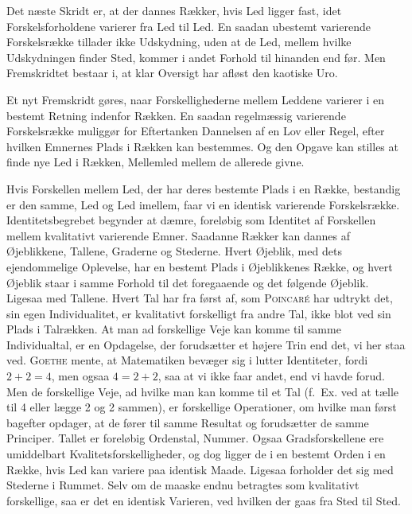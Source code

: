 \documentclass[12pt]{article}
\newcommand{\opage}[1]{\marginnote{\footnotesize\textit{[#1]}}}
\begin{document}
Det næste Skridt er, at der dannes Rækker, hvis Led ligger fast, idet
Forskelsforholdene varierer fra Led til Led. En saadan ubestemt varierende
Forskelsrække tillader ikke Udskydning, uden at de Led, mellem hvilke
Udskydningen finder Sted, kommer i andet Forhold til hinanden end før. Men
Fremskridtet bestaar i, at klar Oversigt har afløst den kaotiske Uro.

Et nyt Fremskridt gøres, naar Forskellighederne mellem Leddene varierer i en
bestemt Retning indenfor Rækken. En saadan regelmæssig varierende
Forskelsrække muliggør for Eftertanken Dannelsen af en Lov eller Regel, efter
hvilken Emnernes Plads i Rækken kan bestemmes.
Og den Opgave kan stilles at finde nye Led i Rækken, Mellemled mellem de
allerede givne.

Hvis Forskellen mellem Led, der har deres bestemte Plads i en Række, bestandig
er den samme, Led og Led imellem, faar vi en identisk varierende Forskelsrække.
Identitetsbegrebet begynder at dæmre, foreløbig som Identitet af Forskellen
mellem kvalitativt varierende Emner. Saadanne Rækker kan dannes af
Øjeblikkene, Tallene, Graderne og Stederne. Hvert Øjeblik, med dets
ejendommelige Oplevelse, har en bestemt Plads i Øjeblikkenes Række, og hvert
Øjeblik staar i samme Forhold til det foregaaende og det følgende Øjeblik.
Ligesaa med Tallene. Hvert Tal har fra først af, som \textsc{Poincaré} har
udtrykt det, sin egen Individualitet, er kvalitativt forskelligt fra andre
Tal, ikke blot ved sin Plads i Talrækken. At man ad forskellige Veje kan komme
til samme Individualtal, er en Opdagelse, der forudsætter et højere Trin end
det, vi her staa ved. \textsc{Goethe} mente, at Matematiken bevæger sig i
lutter Identiteter, fordi $2 + 2 = 4$, men ogsaa $4 = 2 + 2$, saa at vi
\opage{10}ikke faar andet, end vi havde forud. Men de forskellige Veje, ad
hvilke man kan komme til et Tal (f.~Ex. ved at tælle til 4 eller lægge 2 og 2
sammen), er forskellige Operationer, om hvilke man først bagefter opdager, at
de fører til samme Resultat og forudsætter de samme Principer. Tallet er
foreløbig Ordenstal, Nummer. Ogsaa Gradsforskellene ere umiddelbart
Kvalitetsforskelligheder, og dog ligger de i en bestemt Orden i en Række, hvis
Led kan variere paa identisk Maade. Ligesaa forholder det sig med Stederne i
Rummet. Selv om de maaske endnu betragtes som kvalitativt forskellige, saa er
det en identisk Varieren, ved hvilken der gaas fra Sted til Sted.
\end{document}
